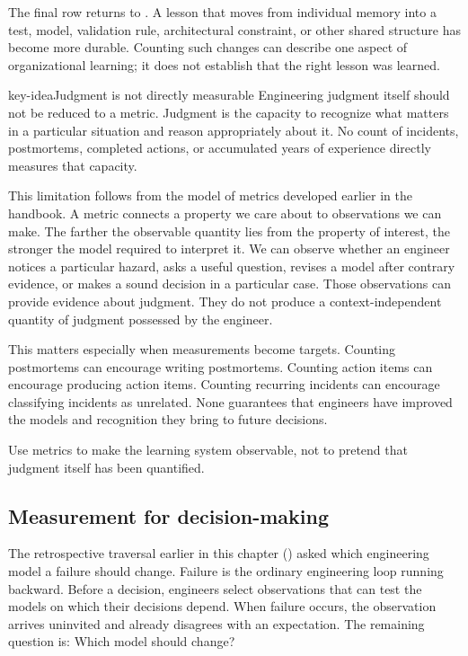 The final row returns to \citet{ch-engineering-knowledge}. A lesson that moves from individual memory
into a test, model, validation rule, architectural constraint, or other shared structure has
become more durable. Counting such changes can describe one aspect of organizational learning; it
does not establish that the right lesson was learned.

\begin{bookbox}{key-idea}{Judgment is not directly measurable} %
Engineering judgment itself should not be reduced to a metric. Judgment is the capacity to
recognize what matters in a particular situation and reason appropriately about it. No count of
incidents, postmortems, completed actions, or accumulated years of experience directly measures
that capacity.

This limitation follows from the model of metrics developed earlier in the handbook. A metric
connects a property we care about to observations we can make. The farther the observable quantity
lies from the property of interest, the stronger the model required to interpret it. We can observe
whether an engineer notices a particular hazard, asks a useful question, revises a model after
contrary evidence, or makes a sound decision in a particular case. Those observations can provide
evidence about judgment. They do not produce a context-independent quantity of judgment possessed
by the engineer.
\end{bookbox}

This matters especially when measurements become targets. Counting postmortems can encourage
writing postmortems. Counting action items can encourage producing action items. Counting recurring
incidents can encourage classifying incidents as unrelated. None guarantees that engineers have
improved the models and recognition they bring to future decisions.

Use metrics to make the learning system observable, not to pretend that judgment itself has been
quantified.

\subsection{Measurement for decision-making}\label{sec-measurement-failure-aware-engineering}

The retrospective traversal earlier in this chapter (\citet{sec-turn-the-handbook-around}) asked which
engineering model a failure should change. Failure is the ordinary engineering loop running
backward. Before a decision, engineers select observations that can test the models on which their
decisions depend. When failure occurs, the observation arrives uninvited and already disagrees with
an expectation. The remaining question is: Which model should change?

